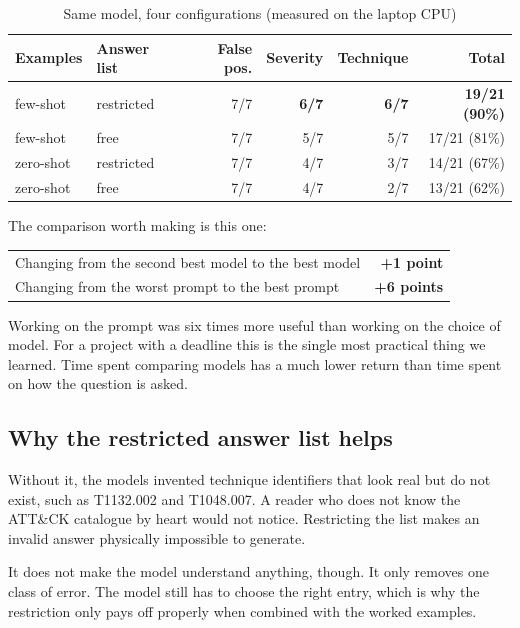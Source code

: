 \documentclass[11pt,a4paper]{article}
\newcommand{\best}[1]{\textbf{#1}}
\begin{document}
\begin{table}[h]
\centering
\small
\caption{Same model, four configurations (measured on the laptop CPU)}
\begin{tabular}{@{}llrrrr@{}}
\toprule
\textbf{Examples} & \textbf{Answer list} & \textbf{False pos.} & \textbf{Severity}
  & \textbf{Technique} & \textbf{Total} \\
\midrule
few-shot  & restricted & 7/7 & \best{6/7} & \best{6/7} & \best{19/21 (90\%)} \\
few-shot  & free       & 7/7 & 5/7 & 5/7 & 17/21 (81\%) \\
zero-shot & restricted & 7/7 & 4/7 & 3/7 & 14/21 (67\%) \\
zero-shot & free       & 7/7 & 4/7 & 2/7 & 13/21 (62\%) \\
\bottomrule
\end{tabular}
\end{table}

The comparison worth making is this one:

\begin{center}
\begin{tabular}{@{}lr@{}}
\toprule
Changing from the second best model to the best model & \best{+1 point} \\
Changing from the worst prompt to the best prompt     & \best{+6 points} \\
\bottomrule
\end{tabular}
\end{center}

Working on the prompt was six times more useful than working on the choice of model.
For a project with a deadline this is the single most practical thing we learned.
Time spent comparing models has a much lower return than time spent on how the
question is asked.

\subsection{Why the restricted answer list helps}

Without it, the models invented technique identifiers that look real but do not
exist, such as T1132.002 and T1048.007. A reader who does not know the ATT\&CK
catalogue by heart would not notice. Restricting the list makes an invalid answer
physically impossible to generate.

It does not make the model understand anything, though. It only removes one class of
error. The model still has to choose the right entry, which is why the restriction
only pays off properly when combined with the worked examples.
\end{document}
